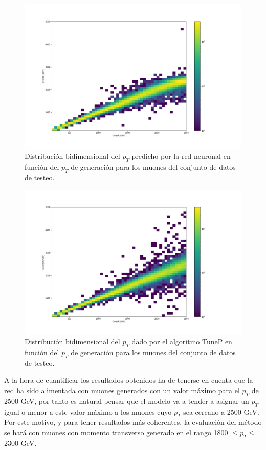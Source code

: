 \begin{figure}[h]
\centering
\includegraphics[width=1.0\textwidth]{figures/data_test_ptpred_genpt.png}
\caption{Distribuci\'on bidimensional del $p_{T}$ predicho por la red neuronal en funci\'on del $p_{T}$ de generaci\'on para los muones del conjunto de datos de testeo.}
\label{fig:test_ptpred_genpt}  
\end{figure}


\begin{figure}[h]
\centering
\includegraphics[width=1.0\textwidth]{figures/data_test_tuneppt_genpt.png}
\caption{Distribuci\'on bidimensional del $p_{T}$ dado por el algoritmo TuneP en funci\'on del $p_{T}$ de generaci\'on para los muones del conjunto de datos de testeo.}
\label{fig:test_tuneppt_genpt}  
\end{figure}

A la hora de cuantificar los resultados obtenidos ha de tenerse en cuenta que la red ha sido alimentada con muones generados con un valor m\'aximo para el $p_{T}$ de 2500 GeV, por tanto es natural pensar que el modelo va a tender a asignar un  $p_{T}$ igual o menor a este valor m\'aximo a los muones cuyo $p_{T}$ sea cercano a 2500 GeV. Por este motivo, y para tener resultados m\'as coherentes, la evaluaci\'on del m\'etodo se har\'a con muones con momento transverso generado en el rango 1800 $\leq p_{T} \leq$ 2300 GeV. \\


